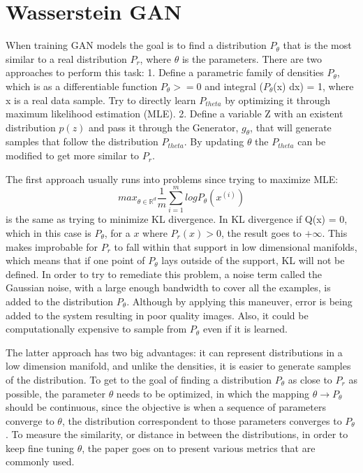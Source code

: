 
\section{Wasserstein GAN}

When training GAN models the goal is to find a distribution $P_{\theta}$ that is the most similar to a real distribution $P_{r}$, where $\theta$ is the parameters. There are two approaches to perform this task:
1. Define a parametric family of densities $P_{\theta}$, which is as a differentiable function $P_{\theta} >= 0$ and integral ($P_{\theta}$(x) dx) = 1, where x is a real data sample. Try to directly learn $P_{theta}$ by optimizing it through maximum likelihood estimation (MLE).
2. Define a variable Z with an existent distribution $p(z)$ and pass it through the Generator, $g_{\theta}$, that will generate samples that follow the distribution $P_{theta}$. By updating $\theta$ the $P_{theta}$ can be modified to get more similar to $P_{r}$.

The first approach usually runs into problems since trying to maximize MLE:
\begin{equation}
	max_{\theta\in \mathbb{R}^{d}} \frac{1}{m} \sum_{i=1}^{m} log P_{\theta}(x^{(i)})
\end{equation}
is the same as trying to minimize KL divergence.
In KL divergence if Q(x) = 0, which in this case is $P_{\theta}$, for a $x$ where $P_{r}(x) > 0$, the result goes to $+\infty$. This makes improbable for $P_{r}$ to fall within that support in low dimensional manifolds, which means that if one point of $P_{\theta}$ lays outside of the support, KL will not be defined. In order to try to remediate this problem, a noise term called the Gaussian noise, with a large enough bandwidth to cover all the examples, is added to the distribution $P_{\theta}$. Although by applying this maneuver, error is being added to the system resulting in poor quality images. Also, it could be computationally expensive to sample from $P_{\theta}$ even if it is learned.

The latter approach has two big advantages: it can represent distributions in a low dimension manifold, and unlike the densities, it is easier to generate samples of the distribution. To get to the goal of finding a distribution  $P_{\theta}$ as close to $P_{r}$ as possible, the parameter $\theta$ needs to be optimized, in which the mapping $\theta \rightarrow P_{\theta}$ should be continuous, since the objective is when a sequence of parameters converge to $\theta$, the distribution correspondent to those parameters converges to $P_{\theta}$. To measure the similarity, or distance in between the distributions, in order to keep fine tuning $\theta$, the paper goes on to present various metrics that are commonly used. 

